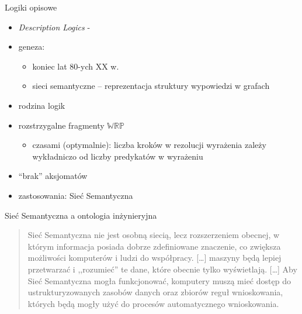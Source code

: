 \documentclass{beamer}
\newcommand {\WRP} {\ensuremath{\mathbb{WRP}}}
\begin{document}
\begin{frame}{Logiki opisowe}
%
\begin{itemize}
\item \emph{Description Logics} - \cite{DBLP:conf/dlog/2003handbook}
%
\item geneza:
\begin{itemize}
\item koniec lat 80-ych XX w.
\item sieci semantyczne -- reprezentacja struktury wypowiedzi w grafach
\end{itemize}
%
\item rodzina logik
%
\item rozstrzygalne fragmenty \WRP
\begin{itemize}
\item czasami (optymalnie): liczba kroków w rezolucji wyrażenia zależy wykładniczo od liczby predykatów w wyrażeniu
\end{itemize}
%
\item ``brak'' aksjomatów
%
\item zastosowania: Sieć Semantyczna
\end{itemize}
\end{frame}

\begin{frame}{Sieć Semantyczna a ontologia inżynieryjna}
%
\begin{quote} Sieć Semantyczna nie jest osobną siecią, lecz rozszerzeniem obecnej, w którym informacja posiada dobrze zdefiniowane znaczenie, co zwiększa możliwości komputerów i ludzi do współpracy. [\dots] maszyny będą lepiej przetwarzać i ,,rozumieć'' te dane, które obecnie tylko wyświetlają. [\dots] Aby Sieć Semantyczna mogła funkcjonować, komputery muszą mieć dostęp do ustrukturyzowanych zasobów danych oraz zbiorów reguł wnioskowania, których będą mogły użyć do procesów automatycznego wnioskowania. %
\end{quote}
\end{frame}

\end{document}
